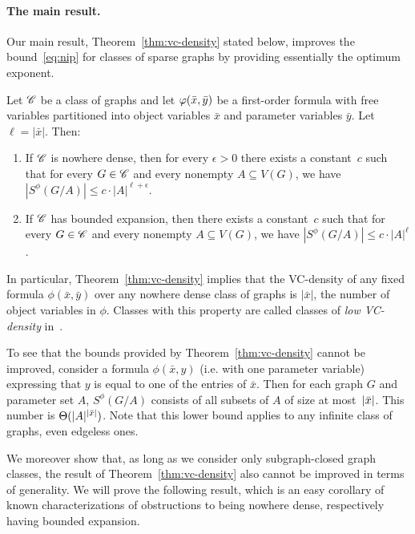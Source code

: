\paragraph{The main result.}
Our main result, Theorem~\ref{thm:vc-density} stated below, improves
the bound~\eqref{eq:nip} for classes of sparse graphs by providing
essentially the optimum exponent.

 \setcounter{vcupper}{\value{theorem}}
 
 \begin{theorem}\label{thm:vc-density}
   Let $\mathscr{C}$ be a class of graphs and let $\varphi(\bar{x},\bar{y})$ be a
   first-order formula with free variables partitioned into object
   variables $\bar x$ and parameter variables $\bar y$. Let
   $\ell=|\bar x|$. Then:
\begin{enumerate}
\item If $\mathscr{C}$ is nowhere dense, then for every $\epsilon>0$ 
there exists a constant~$c$ such that for every $G\in \mathscr{C}$ and every nonempty
$A\subseteq V(G)$, we have $|S^\phi(G/A)|\leq c\cdot |A|^{\ell+\epsilon}.$
\item If $\mathscr{C}$ has bounded expansion, then there exists a
  constant~$c$ such that for every $G\in \mathscr{C}$ and every nonempty
  $A\subseteq V(G)$, we have $|S^\phi(G/A)|\leq c\cdot |A|^\ell$.
\end{enumerate}
 \end{theorem}

 In particular, Theorem~\ref{thm:vc-density} implies that the
 VC-density of any fixed formula $\phi(\bar x,\bar y)$ over any
 nowhere dense class of graphs is $|\bar x|$, the number of object
 variables in $\phi$.  Classes with this property are called classes
 of {\em low VC-density} in~\cite{guingona2013vc}.

 \smallskip To see that the bounds provided by
 Theorem~\ref{thm:vc-density} cannot be improved, consider a formula
 $\phi(\bar x,y)$ (i.e. with one parameter variable) expressing that
 $y$ is equal to one of the entries of $\bar x$. Then for each graph
 $G$ and parameter set $A$, $S^{\phi}(G/A)$ consists of all subsets of
 $A$ of size at most~$|\bar{x}|$. This number is
 $\Theta(|A|^{|\bar{x}|})$. Note that this lower bound applies to any
 infinite class of graphs, even edgeless ones.

 \smallskip We moreover show that, as long as we consider only
 subgraph-closed graph classes, the result of
 Theorem~\ref{thm:vc-density} also cannot be improved in terms of
 generality.  We will prove the following result, which is an easy
 corollary of known characterizations of obstructions to being nowhere
 dense, respectively having bounded expansion.


